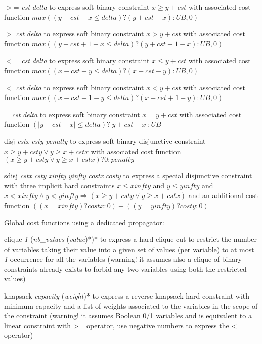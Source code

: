 \documentclass{article}
\begin{document}
\begin{DoxyItemize}
\item $>$= {\itshape cst} {\itshape delta} to express soft binary constraint $x \geq y + cst$ with associated cost function $max( (y + cst - x \leq delta)?(y + cst - x):UB , 0 )$
\item $>$ {\itshape cst} {\itshape delta} to express soft binary constraint $x > y + cst$ with associated cost function $max( (y + cst + 1 - x \leq delta)?(y + cst + 1 - x):UB , 0 )$
\item $<$= {\itshape cst} {\itshape delta} to express soft binary constraint $x \leq y + cst$ with associated cost function $max( (x - cst - y \leq delta)?(x - cst - y):UB , 0 )$
\item $<$ {\itshape cst} {\itshape delta} to express soft binary constraint $x < y + cst$ with associated cost function $max( (x - cst + 1 - y \leq delta)?(x - cst + 1 - y):UB , 0 )$
\item = {\itshape cst} {\itshape delta} to express soft binary constraint $x = y + cst$ with associated cost function $(|y + cst - x| \leq delta)?|y + cst - x|:UB$
\item disj {\itshape cstx} {\itshape csty} {\itshape penalty} to express soft binary disjunctive constraint $x \geq y + csty \vee y \geq x + cstx$ with associated cost function $(x \geq y + csty \vee y \geq x + cstx)?0:penalty$
\item sdisj {\itshape cstx} {\itshape csty} {\itshape xinfty} {\itshape yinfty} {\itshape costx} {\itshape costy} to express a special disjunctive constraint with three implicit hard constraints $x \leq xinfty$ and $y \leq yinfty$ and $x < xinfty \wedge y < yinfty \Rightarrow (x \geq y + csty \vee y \geq x + cstx)$ and an additional cost function $((x = xinfty)?costx:0) + ((y= yinfty)?costy:0)$
\item Global cost functions using a dedicated propagator\-:
\begin{DoxyItemize}
\item clique {\itshape 1} ({\itshape nb\-\_\-values} ({\itshape value})$\ast$)$\ast$ to express a hard clique cut to restrict the number of variables taking their value into a given set of values (per variable) to at most {\itshape 1} occurrence for all the variables (warning! it assumes also a clique of binary constraints already exists to forbid any two variables using both the restricted values)
\item knapsack {\itshape capacity} ({\itshape weight})$\ast$ to express a reverse knapsack hard constraint with minimum capacity and a list of weights associated to the variables in the scope of the constraint (warning! it assumes Boolean 0/1 variables and is equivalent to a linear constraint with >= operator, use negative numbers to express the <= operator)

\end{DoxyItemize}
\end{DoxyItemize}
\end{document}
